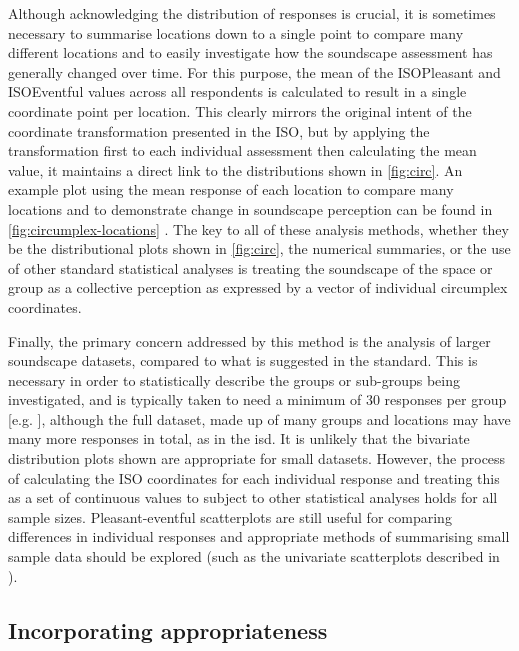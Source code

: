 Although acknowledging the distribution of responses is crucial, it is sometimes necessary to summarise locations down to a single point to compare many different locations and to easily investigate how the soundscape assessment has generally changed over time. For this purpose, the mean of the ISOPleasant and ISOEventful values across all respondents is calculated to result in a single coordinate point per location. This clearly mirrors the original intent of the coordinate transformation presented in the ISO, but by applying the transformation first to each individual assessment then calculating the mean value, it maintains a direct link to the distributions shown in \cref{fig:circ}. An example plot using the mean response of each location to compare many locations and to demonstrate change in soundscape perception can be found in \cref{fig:circumplex-locations} \citep[Fig. 5]{Mitchell2021Investigating}. The key to all of these analysis methods, whether they be the distributional plots shown in \cref{fig:circ}, the numerical summaries, or the use of other standard statistical analyses is treating the soundscape of the space or group as a collective perception as expressed by a vector of individual circumplex coordinates.

Finally, the primary concern addressed by this method is the analysis of larger soundscape datasets, compared to what is suggested in the standard. This is necessary in order to statistically describe the groups or sub-groups being investigated, and is typically taken to need a minimum of 30 responses per group [e.g. \citep{Hong2015Influence,PuyanaRomero2016Modelling}], although the full dataset, made up of many groups and locations may have many more responses in total, as in the \gls{isd}. It is unlikely that the bivariate distribution plots shown are appropriate for small datasets. However, the process of calculating the ISO coordinates for each individual response and treating this as a set of continuous values to subject to other statistical analyses holds for all sample sizes. Pleasant-eventful scatterplots are still useful for comparing differences in individual responses and appropriate methods of summarising small sample data should be explored (such as the univariate scatterplots described in \citet{Weissgerber2015Bar}).

\subsection{Incorporating appropriateness}

